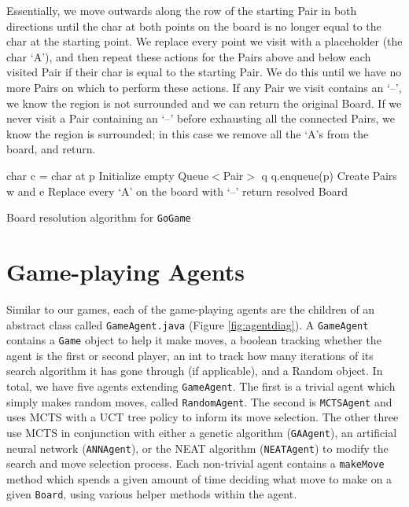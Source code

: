 Essentially, we move outwards along the row of the starting Pair in both directions until the char at both points on the board is no longer equal to the char at the starting point.  We replace every point we visit with a placeholder (the char `A'), and then repeat these actions for the Pairs above and below each visited Pair if their char is equal to the starting Pair.  We do this until we have no more Pairs on which to perform these actions.  If any Pair we visit contains an `--', we know the region is not surrounded and we can return the original Board.  If we never visit a Pair containing an `--' before exhausting all the connected Pairs, we know the region is surrounded; in this case we remove all the `A's from the board, and return.

\begin{algorithm}[htbp]
 \SetAlgoLined %
 
 char c = char at p\;
 Initialize empty Queue$<$Pair$>$ q\;
 q.enqueue(p)\;
 Create Pairs w and e\;
 Replace every `A' on the board with `--'\;
 return resolved Board\;
 \caption{Board resolution algorithm for \texttt{GoGame}}
\label{fig:resolve}
\end{algorithm}

\section{Game-playing Agents}
Similar to our games, each of the game-playing agents are the children of an abstract class called \texttt{GameAgent.java} (Figure \ref{fig:agentdiag}).  A \texttt{GameAgent} contains a \texttt{Game} object to help it make moves, a boolean tracking whether the agent is the first or second player, an int to track how many iterations of its search algorithm it has gone through (if applicable), and a Random object.  In total, we have five agents extending \texttt{GameAgent}.  The first is a trivial agent which simply makes random moves, called \texttt{RandomAgent}.  The second is \texttt{MCTSAgent} and uses MCTS with a UCT tree policy to inform its move selection.  The other three use MCTS in conjunction with either a genetic algorithm (\texttt{GAAgent}), an artificial neural network (\texttt{ANNAgent}), or the NEAT algorithm (\texttt{NEATAgent}) to modify the search and move selection process.  Each non-trivial agent contains a \texttt{makeMove} method which spends a given amount of time deciding what move to make on a given \texttt{Board}, using various helper methods within the agent.

